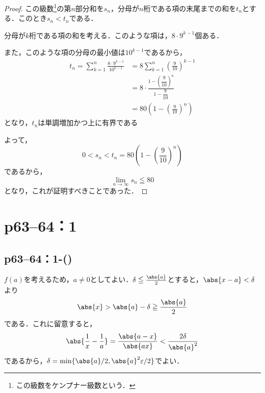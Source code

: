 \begin{tleftbar}
    \begin{proof}
        この級数\footnote{この級数をケンプナー級数という．}の第$n$部分和を$s_n$，分母が$n$桁である項の末尾までの和を$t_n$とする．このとき$s_n < t_n$である．

        分母が$k$桁である項の和を考える．このような項は，$8 \cdot 9^{k-1}$個ある．

        また，このような項の分母の最小値は$10^{k-1}$であるから，
        \begin{align*}
            t_n = \sum_{k=1}^{n} \frac{8 \cdot 9^{k-1}}{10^{k-1}} & = 8 \sum_{k=1}^{n} \left(\frac{9}{10}\right)^{k-1}               \\
                                                                  & = 8 \cdot \frac{1-\left(\dfrac{9}{10}\right)^n}{1-\dfrac{9}{10}} \\
                                                                  & = 80 \left(1-\left(\frac{9}{10}\right)^n\right)
        \end{align*}
        となり，$t_n$は単調増加かつ上に有界である

        よって，
        \[
            0 < s_n < t_n = 80 \left(1-\left(\frac{9}{10}\right)^n\right)
        \]
        であるから，
        \[
            \lim_{n \to \infty} s_n \leqq 80
        \]
        となり，これが証明すべきことであった．
    \end{proof}
\end{tleftbar}


\newpage


\section*{p63--64：1}

\subsection*{p63--64：1-()}

\begin{tleftbar}
    $f(a)$を考えるため，$a \ne 0$としてよい．$\delta \le \frac{\abs{a}}{2}$とすると，$\abs{x-a}<\delta$より
    \[
        \abs{x} > \abs{a}-\delta \ge \frac{\abs{a}}{2}
    \]
    である．これに留意すると，
    \[
        \abs{\frac{1}{x}-\frac{1}{a}}=\frac{\abs{a-x}}{\abs{ax}} <\frac{2 \delta}{\abs{a}^2}
    \]
    であるから，$\delta = \min \{ \abs{a}/2,\abs{a}^2\varepsilon/2 \}$でよい．
\end{tleftbar}




